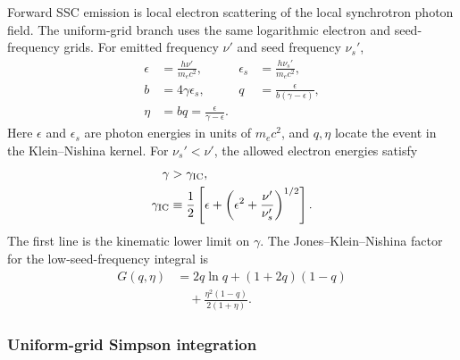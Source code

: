 \documentclass[twocolumn]{aastex702}
\begin{document}
Forward SSC emission is local electron scattering of the local synchrotron
photon field.  The uniform-grid branch uses the same logarithmic electron and
seed-frequency grids.  For emitted frequency \(\nu'\) and seed frequency
\(\nu_s'\),
\begin{equation}
\begin{aligned}
\epsilon&=\frac{h\nu'}{m_ec^2},&
\epsilon_s&=\frac{h\nu_s'}{m_ec^2},\\
b&=4\gamma\epsilon_s,&
q&=\frac{\epsilon}{b(\gamma-\epsilon)},\\
\eta&=bq=\frac{\epsilon}{\gamma-\epsilon}.
\end{aligned}
\end{equation}
Here \(\epsilon\) and \(\epsilon_s\) are photon energies in units of \(m_ec^2\),
and \(q,\eta\) locate the event in the Klein--Nishina kernel.  For
\(\nu_s'<\nu'\), the allowed electron energies satisfy
\begin{equation}
\begin{aligned}
\gamma&>\gamma_{\rm IC},\\
\gamma_{\rm IC}
&\equiv
\frac{1}{2}\left[\epsilon+
\left(\epsilon^2+\frac{\nu'}{\nu_s'}\right)^{1/2}\right].
\end{aligned}
\end{equation}
The first line is the kinematic lower limit on \(\gamma\).  The
Jones--Klein--Nishina factor for the low-seed-frequency integral is
\begin{equation}
\begin{aligned}
G(q,\eta)
&=2q\ln q+(1+2q)(1-q)\\
&\quad+\frac{\eta^2(1-q)}{2(1+\eta)} .
\end{aligned}
\label{eq:ssc-kernel}
\end{equation}

\subsubsection{Uniform-grid Simpson integration}
\end{document}
